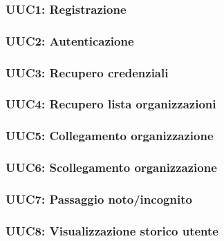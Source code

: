 \documentclass[../analisi-dei-requisiti.tex]{subfiles}
\begin{document}
\subsubsection{UUC1: Registrazione}%
\label{subs:UUC1}



\subsubsection{UUC2: Autenticazione}%
\label{subs:UUC2}



\subsubsection{UUC3: Recupero credenziali}%
\label{subs:UUC3}



\subsubsection{UUC4: Recupero lista organizzazioni}%
\label{subs:UUC4}



\subsubsection{UUC5: Collegamento organizzazione}%
\label{subs:UUC5}



\subsubsection{UUC6: Scollegamento organizzazione}%
\label{subs:UUC6}



\subsubsection{UUC7: Passaggio noto/incognito}%
\label{subs:UUC7}



\subsubsection{UUC8: Visualizzazione storico utente}%
\label{subs:UUC8}
\end{document}
